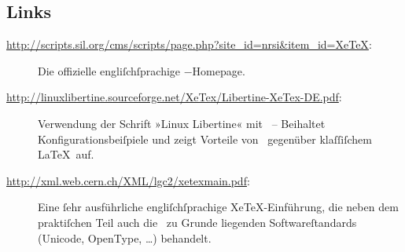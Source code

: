 ﻿\documentclass{scrartcl}
\begin{document}
\subsection*{Links}
\begin{description}
\item[\url{http://scripts.sil.org/cms/scripts/page.php?site_id=nrsi&item_id=XeTeX}:] Die offizielle engliſchſprachige \XeTeX−Homepage.
\item[\url{http://linuxlibertine.sourceforge.net/XeTex/Libertine-XeTex-DE.pdf}:] Verwendung der Schrift »Linux Libertine« mit \XeTeX\ – Beihaltet Konfigurationsbeiſpiele und zeigt Vorteile von \XeTeX\ gegenüber klaſſiſchem \LaTeX\ auf.
\item[\url{http://xml.web.cern.ch/XML/lgc2/xetexmain.pdf}:] Eine ſehr ausführliche engliſchſprachige XeTeX-Einführung, die neben dem praktiſchen Teil auch die \XeTeX\ zu Grunde liegenden Softwareſtandards (Unicode, OpenType, …) behandelt.
\end{description}



\end{document}
